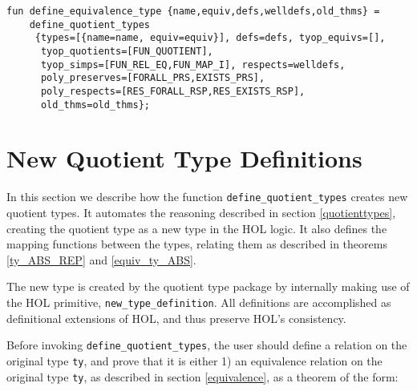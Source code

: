 \documentclass[envcountsame,runningheads]{llncs}
\begin{document}
\begin{verbatim}
fun define_equivalence_type {name,equiv,defs,welldefs,old_thms} =
    define_quotient_types
     {types=[{name=name, equiv=equiv}], defs=defs, tyop_equivs=[],
      tyop_quotients=[FUN_QUOTIENT],
      tyop_simps=[FUN_REL_EQ,FUN_MAP_I], respects=welldefs,
      poly_preserves=[FORALL_PRS,EXISTS_PRS],
      poly_respects=[RES_FORALL_RSP,RES_EXISTS_RSP],
      old_thms=old_thms};
\end{verbatim}



%
\section{New Quotient Type Definitions}
%
\label{newquotienttype}

In this section we describe how 
the function {\tt define\_quotient\_types} creates new quotient types.
It automates the reasoning described
in section \ref{quotienttypes},
creating the quotient type as a new type in
the HOL logic.  It also defines the mapping functions between the
types, relating them as described in theorems
\ref{ty_ABS_REP}
and
\ref{equiv_ty_ABS}.

The new type is created by the quotient type package by internally 
making use of the HOL primitive, {\tt new\_type\_definition}. 
All definitions are accomplished as definitional extensions of HOL,
and thus
preserve HOL's consistency.

Before invoking {\tt define\_quotient\_types}, the user should define
a relation on the original type {\tt ty}, and prove that it is
either 1)
an equivalence relation on the original type {\tt ty}, as described
in section \ref{equivalence},
as a theorem
of the form:
\end{document}

